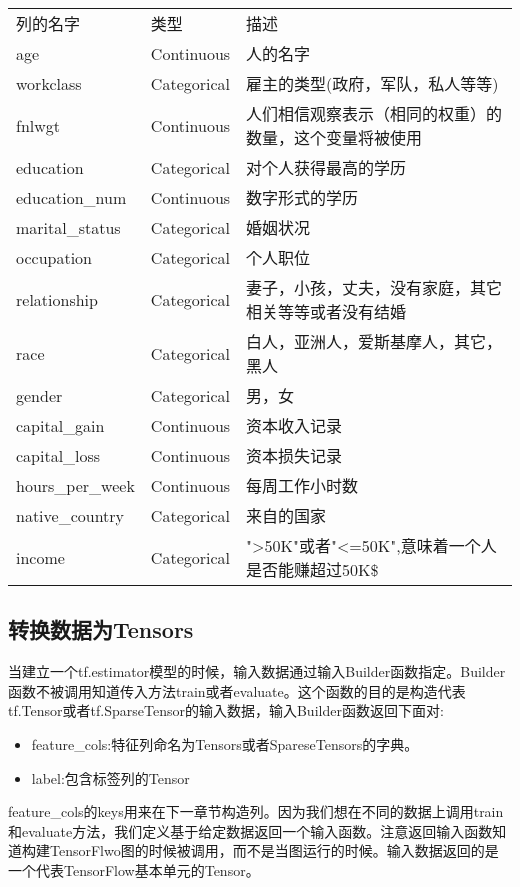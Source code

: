 \begin{tabular}{ |p{1cm}||p{1cm}|p{8cm}|}
列的名字&类型&描述\\
age&Continuous&人的名字\\
workclass&  Categorical&雇主的类型(政府，军队，私人等等)\\
fnlwgt& Continuous& 人们相信观察表示（相同的权重）的数量，这个变量将被使用\\
education&  Categorical&对个人获得最高的学历\\
education\_num& Continuous& 数字形式的学历\\
marital\_status&  Categorical&婚姻状况\\
occupation& Categorical&个人职位\\
relationship& Categorical &妻子，小孩，丈夫，没有家庭，其它相关等等或者没有结婚\\
race& Categorical&白人，亚洲人，爱斯基摩人，其它，黑人\\
gender& Categorical&男，女\\
capital\_gain&  Continuous& 资本收入记录\\
capital\_loss&  Continuous& 资本损失记录\\
hours\_per\_week& Continuous& 每周工作小时数\\
native\_country&  Categorical&  来自的国家\\
income& Categorical&">50K"或者"<=50K",意味着一个人是否能赚超过50K\$
\end{tabular}
\subsection{转换数据为Tensors}
当建立一个tf.estimator模型的时候，输入数据通过输入Builder函数指定。Builder函数不被调用知道传入方法train或者evaluate。这个函数的目的是构造代表tf.Tensor或者tf.SparseTensor的输入数据，输入Builder函数返回下面对:
\begin{itemize}
  \item feature\_cols:特征列命名为Tensors或者SpareseTensors的字典。
  \item label:包含标签列的Tensor
\end{itemize}
feature\_cols的keys用来在下一章节构造列。因为我们想在不同的数据上调用train和evaluate方法，我们定义基于给定数据返回一个输入函数。注意返回输入函数知道构建TensorFlwo图的时候被调用，而不是当图运行的时候。输入数据返回的是一个代表TensorFlow基本单元的Tensor。

